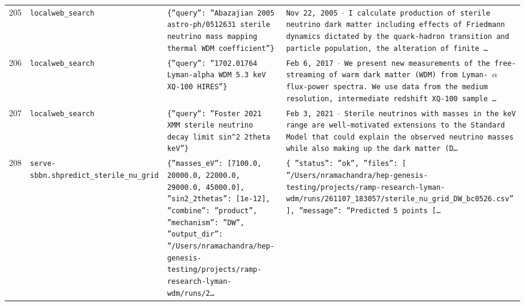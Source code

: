 \documentclass[11pt,a4paper]{article}
\begin{document}
\begin{longtable}{@{}p{}p{}p{}p{}@{}}
205 & \texttt{local}\newline\texttt{web\_\allowbreak{}search} & \texttt{\{''query'':\allowbreak{} ''Abazajian 2005 astro-ph/\allowbreak{}0512631 sterile neutrino mass mapping thermal WDM coefficient''\}\allowbreak{}} & \texttt{Nov 22,\allowbreak{} 2005 $\cdot$ I calculate production of sterile neutrino dark matter including effects of Friedmann dynamics dictated by the quark-hadron transition and particle population,\allowbreak{} the alteration of finite \ldots{}\allowbreak{}} \\
206 & \texttt{local}\newline\texttt{web\_\allowbreak{}search} & \texttt{\{''query'':\allowbreak{} ''1702.01764 Lyman-alpha WDM 5.3 keV XQ-100 HIRES''\}\allowbreak{}} & \texttt{Feb 6,\allowbreak{} 2017 $\cdot$ We present new measurements of the free-streaming of warm dark matter (WDM)\allowbreak{} from Lyman- $\alpha$ flux-power spectra. We use data from the medium resolution,\allowbreak{} intermediate redshift XQ-100 sample \ldots{}\allowbreak{}} \\
207 & \texttt{local}\newline\texttt{web\_\allowbreak{}search} & \texttt{\{''query'':\allowbreak{} ''Foster 2021 XMM sterile neutrino decay limit sin\textasciicircum{}\allowbreak{}2 2theta keV''\}\allowbreak{}} & \texttt{Feb 3,\allowbreak{} 2021 $\cdot$ Sterile neutrinos with masses in the keV range are well-motivated extensions to the Standard Model that could explain the observed neutrino masses while also making up the dark matter (D\ldots{}\allowbreak{}} \\
208 & \texttt{serve-sbbn.sh}\newline\texttt{predict\_\allowbreak{}sterile\_\allowbreak{}nu\_\allowbreak{}grid} & \texttt{\{''masses\_\allowbreak{}eV'':\allowbreak{} [7100.0,\allowbreak{} 20000.0,\allowbreak{} 22000.0,\allowbreak{} 29000.0,\allowbreak{} 45000.0]\allowbreak{},\allowbreak{} ''sin2\_\allowbreak{}2thetas'':\allowbreak{} [1e-12]\allowbreak{},\allowbreak{} ''combine'':\allowbreak{} ''product'',\allowbreak{} ''mechanism'':\allowbreak{} ''DW'',\allowbreak{} ''output\_\allowbreak{}dir'':\allowbreak{} ''/\allowbreak{}Users/\allowbreak{}nramachandra/\allowbreak{}hep-genesis-testing/\allowbreak{}projects/\allowbreak{}ramp-research-lyman-wdm/\allowbreak{}runs/\allowbreak{}2\ldots{}\allowbreak{}} & \texttt{\{   ''status'':\allowbreak{} ''ok'',\allowbreak{}   ''files'':\allowbreak{} [     ''/\allowbreak{}Users/\allowbreak{}nramachandra/\allowbreak{}hep-genesis-testing/\allowbreak{}projects/\allowbreak{}ramp-research-lyman-wdm/\allowbreak{}runs/\allowbreak{}261107\_\allowbreak{}183057/\allowbreak{}sterile\_\allowbreak{}nu\_\allowbreak{}grid\_\allowbreak{}DW\_\allowbreak{}bc0526.csv''   ]\allowbreak{},\allowbreak{}   ''message'':\allowbreak{} ''Predicted 5 points [\ldots{}\allowbreak{}} \\

\end{longtable}
\end{document}
